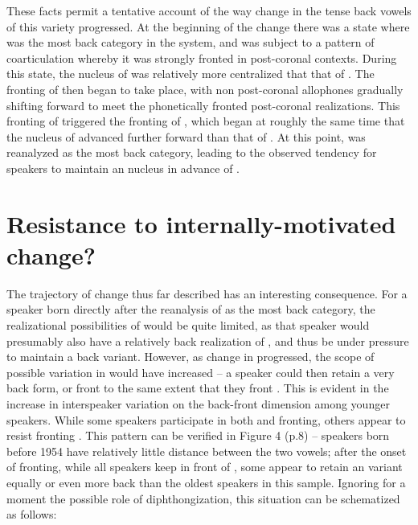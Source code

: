 \documentclass[12pt]{article}
\begin{document}
These facts permit a tentative account of the way change in the tense back vowels of this variety progressed. At the beginning of the change there was a state where  was the most back category in the system, and was subject to a pattern of coarticulation whereby it was strongly fronted in post-coronal contexts. During this state, the nucleus of  was relatively more centralized that that of . The fronting of  then began to take place, with non post-coronal allophones gradually shifting forward to meet the phonetically fronted post-coronal realizations. This fronting of  triggered the fronting of , which began at roughly the same time that the nucleus of  advanced further forward than that of . At this point,  was reanalyzed as the most back category, leading to the observed tendency for speakers to maintain an  nucleus in advance of .

\section{Resistance to internally-motivated change?}

The trajectory of change thus far described has an interesting consequence. For a speaker born directly after the reanalysis of  as the most back category, the realizational possibilities of  would be quite limited, as that speaker would presumably also have a relatively back realization of , and thus be under pressure to maintain a back  variant. However, as change in  progressed, the scope of possible variation in  would have increased -- a speaker could then retain a very back form, or front  to the same extent that they front . This is evident in the increase in interspeaker variation on the back-front dimension among younger speakers. While some speakers participate in both  and  fronting, others appear to resist fronting . This pattern can be verified in Figure 4 (p.8) -- speakers born before 1954 have relatively little distance between the two vowels; after the onset of  fronting, while all speakers keep  in front of , some appear to retain an  variant equally or even more back than the oldest speakers in this sample. Ignoring for a moment the possible role of diphthongization, this situation can be schematized as follows:
\end{document}
